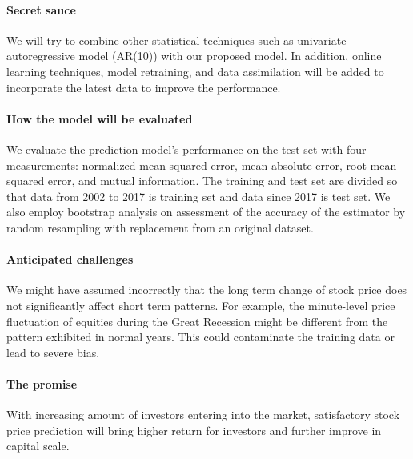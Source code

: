 \documentclass{article}
\begin{document}
\paragraph{Secret sauce}
We will try to combine other statistical techniques such as univariate autoregressive model (AR(10)) with our proposed model. In addition, online learning techniques, model retraining, and data assimilation will be added to incorporate the latest data to improve the performance.

\paragraph{How the model will be evaluated}
We evaluate the prediction model's performance on the test set with four measurements: normalized mean squared error, mean absolute error, root mean squared error, and mutual information. The training and test set are divided so that data from 2002 to 2017 is training set and data since 2017 is test set. We also employ bootstrap analysis on assessment of the accuracy of the estimator by random resampling with replacement from an original dataset.

\paragraph{Anticipated challenges}
We might have assumed incorrectly that the long term change of stock price does not significantly affect short term patterns. For example, the minute-level price fluctuation of equities during the Great Recession might be different from the pattern exhibited in normal years. This could contaminate the training data or lead to severe bias.

\paragraph{The promise}
With increasing amount of investors entering into the market, satisfactory stock price prediction will bring higher return for investors and further improve in capital scale.

\newpage


\end{document}
